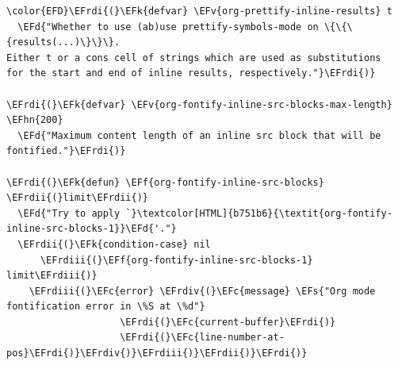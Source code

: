 \documentclass{scrartcl}
\newcommand{\EFk}[1]{\textcolor{EFk}{#1}} %
\newcommand{\EFd}[1]{\textcolor{EFd}{\textit{#1}}} %
\newcommand{\EFs}[1]{\textcolor{EFs}{#1}} %
\newcommand{\EFc}[1]{\textcolor{EFc}{#1}} %
\newcommand{\EFv}[1]{\textcolor{EFv}{#1}} %
\newcommand{\EFf}[1]{\textcolor{EFf}{#1}} %
\newcommand{\EFhn}[1]{\textcolor{EFhn}{\textbf{#1}}} %
\newcommand{\EFrdi}[1]{\textcolor{EFrdi}{#1}} %
\newcommand{\EFrdii}[1]{\textcolor{EFrdii}{#1}} %
\newcommand{\EFrdiii}[1]{\textcolor{EFrdiii}{#1}} %
\newcommand{\EFrdiv}[1]{\textcolor{EFrdiv}{#1}} %
\begin{document}
\begin{Code}
\begin{Verbatim}[]
\color{EFD}\EFrdi{(}\EFk{defvar} \EFv{org-prettify-inline-results} t
  \EFd{"Whether to use (ab)use prettify-symbols-mode on \{\{\{results(...)\}\}\}.
Either t or a cons cell of strings which are used as substitutions
for the start and end of inline results, respectively."}\EFrdi{)}

\EFrdi{(}\EFk{defvar} \EFv{org-fontify-inline-src-blocks-max-length} \EFhn{200}
  \EFd{"Maximum content length of an inline src block that will be fontified."}\EFrdi{)}

\EFrdi{(}\EFk{defun} \EFf{org-fontify-inline-src-blocks} \EFrdii{(}limit\EFrdii{)}
  \EFd{"Try to apply `}\textcolor[HTML]{b751b6}{\textit{org-fontify-inline-src-blocks-1}}\EFd{'."}
  \EFrdii{(}\EFk{condition-case} nil
      \EFrdiii{(}\EFf{org-fontify-inline-src-blocks-1} limit\EFrdiii{)}
    \EFrdiii{(}\EFc{error} \EFrdiv{(}\EFc{message} \EFs{"Org mode fontification error in \%S at \%d"}
                    \EFrdi{(}\EFc{current-buffer}\EFrdi{)}
                    \EFrdi{(}\EFc{line-number-at-pos}\EFrdi{)}\EFrdiv{)}\EFrdiii{)}\EFrdii{)}\EFrdi{)}


\end{Verbatim}
\end{Code}
\end{document}
